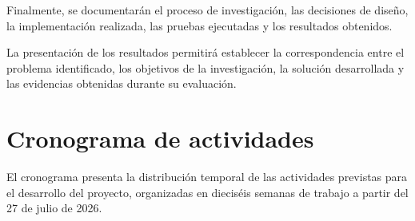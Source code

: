 Finalmente, se documentarán el proceso de investigación,
las decisiones de diseño, la implementación realizada,
las pruebas ejecutadas y los resultados obtenidos.

La presentación de los resultados permitirá establecer la
correspondencia entre el problema identificado, los
objetivos de la investigación, la solución desarrollada
y las evidencias obtenidas durante su evaluación.



\clearpage

\section{Cronograma de actividades}
\label{sec:cronograma}

El cronograma presenta la distribución temporal de las
actividades previstas para el desarrollo del proyecto,
organizadas en dieciséis semanas de trabajo a partir
del 27 de julio de 2026.

